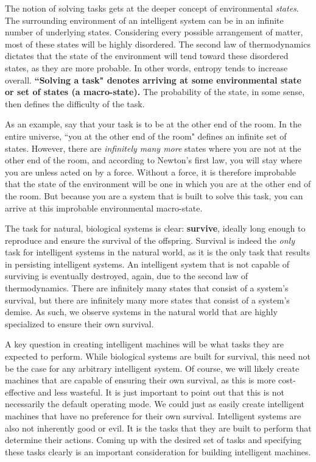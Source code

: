 The notion of solving tasks gets at the deeper concept of environmental \textit{states}. The surrounding environment of an intelligent system can be in an infinite number of underlying states. Considering every possible arrangement of matter, most of these states will be highly disordered. The second law of thermodynamics dictates that the state of the environment will tend toward these disordered states, as they are more probable. In other words, entropy tends to increase overall. \textbf{``Solving a task" denotes arriving at some environmental state or set of states (a macro-state).} The probability of the state, in some sense, then defines the difficulty of the task. 

As an example, say that your task is to be at the other end of the room. In the entire universe, ``you at the other end of the room" defines an infinite set of states. However, there are \textit{infinitely many more} states where you are not at the other end of the room, and according to Newton's first law, you will stay where you are unless acted on by a force. Without a force, it is therefore improbable that the state of the environment will be one in which you are at the other end of the room. But because you are a system that is built to solve this task, you can arrive at this improbable environmental macro-state.

The task for natural, biological systems is clear: \textbf{survive}, ideally long enough to reproduce and ensure the survival of the offspring. Survival is indeed the \textit{only} task for intelligent systems in the natural world, as it is the only task that results in persisting intelligent systems. An intelligent system that is not capable of surviving is eventually destroyed, again, due to the second law of thermodynamics. There are infinitely many states that consist of a system's survival, but there are infinitely many more states that consist of a system's demise. As such, we observe systems in the natural world that are highly specialized to ensure their own survival.

A key question in creating intelligent machines will be what tasks they are expected to perform. While biological systems are built for survival, this need not be the case for any arbitrary intelligent system. Of course, we will likely create machines that are capable of ensuring their own survival, as this is more cost-effective and less wasteful. It is just important to point out that this is not necessarily the default operating mode. We could just as easily create intelligent machines that have no preference for their own survival. Intelligent systems are also not inherently good or evil. It is the tasks that they are built to perform that determine their actions. Coming up with the desired set of tasks and specifying these tasks clearly is an important consideration for building intelligent machines.


